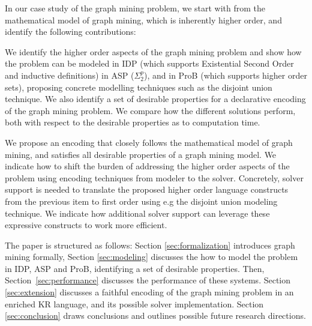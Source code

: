 In our case study of the graph mining problem, we start with from the mathematical model of graph mining, which is inherently higher order, and identify the following contributions:
\begin{compactitem}
\item We identify the higher order aspects of the graph mining problem and show how the problem can be modeled in IDP (which supports Existential Second Order and inductive definitions) in ASP ($\Sigma_{2}^{p}$), and in ProB (which supports higher order sets), proposing concrete modelling techniques such as the disjoint union technique. 
We also identify a set of desirable properties for a declarative encoding of the graph mining problem.
We compare how the different solutions perform, both with respect to the desirable properties as to computation time.
\item We propose an encoding that closely follows the mathematical model of graph mining, and satisfies all desirable properties of a graph mining model.
We indicate how to shift the burden of addressing the higher order aspects of the problem using encoding techniques from modeler to the solver. 
Concretely, solver support is needed to translate the proposed higher order language constructs from the previous item to first order using e.g the disjoint union modeling technique.
We indicate how additional solver support can leverage these expressive constructs to work more efficient.
\end{compactitem}
The paper is structured as follows: Section \ref{sec:formalization} introduces graph mining formally, Section \ref{sec:modeling} discusses the how to model the problem in IDP, ASP and ProB, identifying a set of desirable properties.
Then, Section~\ref{sec:performance} discusses the performance of these systems.
Section \ref{sec:extension} discusses a faithful encoding of the graph mining problem in an enriched KR language, and its possible solver implementation. Section \ref{sec:conclusion} draws conclusions and outlines possible future research directions.